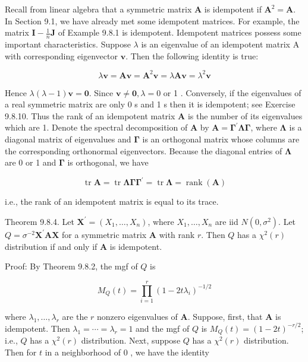 Recall from linear algebra that a symmetric matrix $\mathbf{A}$ is idempotent if $\mathbf{A}^{2}=\mathbf{A}$. In Section 9.1, we have already met some idempotent matrices. For example, the matrix $\mathbf{I}-\frac{1}{n} \mathbf{J}$ of Example 9.8.1 is idempotent. Idempotent matrices possess some important characteristics. Suppose $\lambda$ is an eigenvalue of an idempotent matrix A with corresponding eigenvector $\mathbf{v}$. Then the following identity is true:

$$
\lambda \mathbf{v}=\mathbf{A} \mathbf{v}=\mathbf{A}^{2} \mathbf{v}=\lambda \mathbf{A} \mathbf{v}=\lambda^{2} \mathbf{v}
$$

Hence $\lambda(\lambda-1) \mathbf{v}=\mathbf{0}$. Since $\mathbf{v} \neq \mathbf{0}, \lambda=0$ or 1 . Conversely, if the eigenvalues of a real symmetric matrix are only 0 s and 1 s then it is idempotent; see Exercise 9.8.10. Thus the rank of an idempotent matrix $\mathbf{A}$ is the number of its eigenvalues which are 1. Denote the spectral decomposition of $\mathbf{A}$ by $\mathbf{A}=\boldsymbol{\Gamma}^{\prime} \boldsymbol{\Lambda} \boldsymbol{\Gamma}$, where $\boldsymbol{\Lambda}$ is a diagonal matrix of eigenvalues and $\boldsymbol{\Gamma}$ is an orthogonal matrix whose columns are the corresponding orthonormal eigenvectors. Because the diagonal entries of $\boldsymbol{\Lambda}$ are 0 or 1 and $\boldsymbol{\Gamma}$ is orthogonal, we have

$$
\operatorname{tr} \mathbf{A}=\operatorname{tr} \boldsymbol{\Lambda} \boldsymbol{\Gamma} \boldsymbol{\Gamma}^{\prime}=\operatorname{tr} \boldsymbol{\Lambda}=\operatorname{rank}(\mathbf{A})
$$

i.e., the rank of an idempotent matrix is equal to its trace.

Theorem 9.8.4. Let $\mathbf{X}^{\prime}=\left(X_{1}, \ldots, X_{n}\right)$, where $X_{1}, \ldots, X_{n}$ are iid $N\left(0, \sigma^{2}\right)$. Let $Q=\sigma^{-2} \mathbf{X}^{\prime} \mathbf{A X}$ for a symmetric matrix $\mathbf{A}$ with rank $r$. Then $Q$ has a $\chi^{2}(r)$ distribution if and only if $\mathbf{A}$ is idempotent.

Proof: By Theorem 9.8.2, the mgf of $Q$ is


\begin{equation*}
M_{Q}(t)=\prod_{i=1}^{r}\left(1-2 t \lambda_{i}\right)^{-1 / 2} \tag{9.8.14}
\end{equation*}


where $\lambda_{1}, \ldots, \lambda_{r}$ are the $r$ nonzero eigenvalues of $\mathbf{A}$. Suppose, first, that $\mathbf{A}$ is idempotent. Then $\lambda_{1}=\cdots=\lambda_{r}=1$ and the mgf of $Q$ is $M_{Q}(t)=(1-2 t)^{-r / 2}$; i.e., $Q$ has a $\chi^{2}(r)$ distribution. Next, suppose $Q$ has a $\chi^{2}(r)$ distribution. Then for $t$ in a neighborhood of 0 , we have the identity

